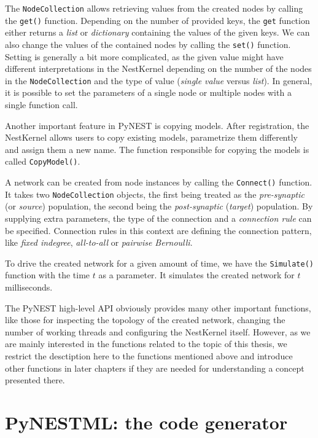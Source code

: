 The \texttt{NodeCollection} allows retrieving values from the created nodes by calling the \texttt{get()} function. Depending on the number of provided keys, the \texttt{get} function either returns a \emph{list} or \emph{dictionary} containing the values of the given keys. We can also change the values of the contained nodes by calling the \texttt{set()} function. Setting is generally a bit more complicated, as the given value might have different interpretations in the NestKernel depending on the number of the nodes in the \texttt{NodeCollection} and the type of value (\emph{single value} versus \emph{list}). In general, it is possible to set the parameters of a single node or multiple nodes with a single function call.

Another important feature in PyNEST is copying models. After registration, the NestKernel allows users to copy existing models, parametrize them differently and assign them a new name. The function responsible for copying the models is called \texttt{CopyModel()}.

A network can be created from node instances by calling the \texttt{Connect()} function. It takes two \texttt{NodeCollection} objects, the first being treated as the \emph{pre-synaptic} (or \emph{source}) population, the second being the \emph{post-synaptic} (\emph{target}) population. By supplying extra parameters, the type of the connection and a \emph{connection rule} can be specified. Connection rules in this context are defining the connection pattern, like \emph{fixed indegree}, \emph{all-to-all} or \emph{pairwise Bernoulli}.

To drive the created network for a given amount of time, we have the \texttt{Simulate()} function with the time $t$ as a parameter. It simulates the created network for $t$ milliseconds.

The PyNEST high-level API obviously provides many other important functions, like those for inspecting the topology of the created network, changing the number of working threads and configuring the NestKernel itself. However, as we are mainly interested in the functions related to the topic of this thesis, we restrict the desctiption here to the functions mentioned above and introduce other functions in later chapters if they are needed for understanding a concept presented there.

\section{PyNESTML: the code generator}

